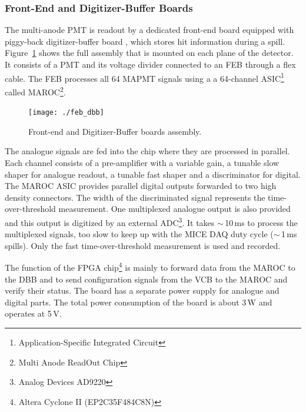 \documentclass[a4paper,11pt]{article}
\begin{document}
\subsubsection{Front-End and Digitizer-Buffer Boards}

The multi-anode PMT is readout by a dedicated front-end board equipped with piggy-back digitizer-buffer board \cite{Bolognini2011108}, which stores
hit information during a spill. Figure~\ref{fig:feb_dbb} shows the full assembly that is mounted on each plane of the detector. It consists of a PMT
and its voltage divider connected to an FEB through a flex cable. The FEB processes all 64 MAPMT signals using a a 64-channel ASIC\footnote{Application-Specific Integrated Circuit} called MAROC\footnote{Multi Anode
ReadOut Chip}\cite{maroc}.

\begin{figure}[htp!]
 \centering
 \texttt{[image: ./feb\_dbb]}
 \caption[Front-end and buffer board assembly]{Front-end and Digitizer-Buffer boards assembly.}
 \label{fig:feb_dbb}
\end{figure}

The analogue signals are fed into the chip where they are processed in parallel. Each channel consists of a pre-amplifier with a variable gain,
a tunable slow shaper for analogue readout, a tunable fast shaper and a discriminator for digital.
The MAROC ASIC provides parallel digital outputs forwarded to two high density connectors. The width of the
discriminated signal represents the time-over-threshold measurement. One multiplexed analogue output is also provided and this output is digitized by
an external ADC\footnote{Analog Devices AD9220}. It takes $\sim\,$10\,ms to process the multiplexed signals,
too slow to keep up with the MICE DAQ duty cycle ($\sim\,$1\,ms spills). Only the fast time-over-threshold
measurement is used and recorded.

The function of the FPGA chip\footnote{Altera Cyclone II (EP2C35F484C8N)} is mainly to forward data from the MAROC to the DBB and to send configuration
signals from the VCB to the MAROC and verify their status. The board has a separate power supply for analogue and digital parts. The total
power consumption of the board is about 3\,W and operates at 5\,V.
\end{document}
